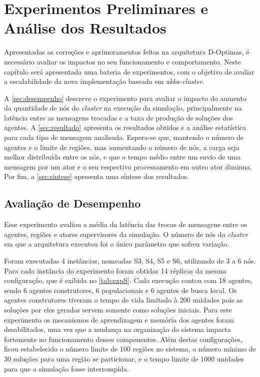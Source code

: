 

\chapter{Experimentos Preliminares e Análise dos Resultados}
\label{chap:resultados}

Apresentadas as correções e aprimoramentos feitos na arquitetura D-Optimas, é necessário avaliar os impactos no seu funcionamento e comportamento. Neste capítulo será apresentada uma  bateria de experimentos, com o objetivo de avaliar a escalabilidade da nova implementação baseada em \textit{akka-cluster}.

A \autoref{sec:desempenho} descreve o experimento para avaliar o impacto do aumento da quantidade de nós do \textit{cluster} na execução da simulação, principalmente na latência entre as mensagens trocadas e a taxa de produção de soluções dos agentes. A \autoref{sec:resultado} apresenta os resultados obtidos e a análise estatística para cada tipo de mensagem analisada. Espera-se que, mantendo o número de agentes e o limite de regiões, mas aumentando o número de nós, a carga seja melhor distribuída entre os nós, e que o tempo médio entre um envio de uma mensagem por um ator e o seu respectivo processamento em outro ator diminua. Por fim, a \autoref{sec:sintese} apresenta uma síntese dos resultados. 

\section{Avaliação de Desempenho}
\label{sec:desempenho}

Esse experimento avaliou a média da latência das trocas de mensagens entre os agentes, regiões e atores supervisores da simulação. O número de nós do \textit{cluster} em que a arquitetura executou foi o único parâmetro que sofreu variação. 

Foram executadas 4 instâncias, nomeadas S3, S4, S5 e S6, utilizando de 3 a 6 nós. Para cada instância do experimento foram obtidas 14 réplicas da mesma configuração, que é exibida no \autoref{tab:expS}. Cada execução contou com 18 agentes, sendo 6 agentes construtores, 6 populacionais e 6 agentes de busca local. Os agentes construtores tiveram o tempo de vida limitado à 200 unidades pois as soluções por eles geradas servem somente como soluções iniciais.
Para este experimento os mecanismos de aprendizagem e memória dos agentes foram desabilitados, uma vez que a mudança na organização do sistema impacta fortemente no funcionamento desses componentes. 
Além destas configurações, ficou estabelecido o número limite de 100 regiões no sistema, o número mínimo de 30 soluções para uma região se particionar, e o tempo limite de 1000 unidades para que a simulação fosse interrompida.

